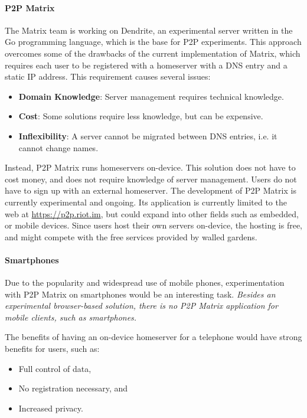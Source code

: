 \paragraph{\ac{P2P} Matrix}
The Matrix team is working on Dendrite\cite{matrix_org_dendrite}, an experimental server written in the Go programming language, which is the base for \ac{P2P} experiments.
This approach overcomes some of the drawbacks of the current implementation of Matrix, which requires each user to be registered with a homeserver with a \ac{DNS} entry and a static IP address.
This requirement causes several issues:
\begin{itemize}
    \item{
          \textbf{Domain Knowledge}:
          Server management requires technical knowledge.
          }
    \item{
          \textbf{Cost}:
          Some solutions require less knowledge, but can be expensive.
          }
    \item{
          \textbf{Inflexibility}:
          A server cannot be migrated between \ac{DNS} entries, i.e. it cannot change names.
          }
\end{itemize}
Instead, \ac{P2P} Matrix runs homeservers on-device.
This solution does not have to cost money, and does not require knowledge of server management.
Users do not have to sign up with an external homeserver.
The development of \ac{P2P} Matrix is currently experimental and ongoing.
Its application is currently limited to the web at \url{https://p2p.riot.im}, but could expand into other fields such as embedded, or mobile devices.
Since users host their own servers on-device, the hosting is free, and might compete with the free services provided by walled gardens.

\paragraph{Smartphones}
Due to the popularity and widespread use of mobile phones, experimentation with \ac{P2P} Matrix on smartphones would be an interesting task.
\textit{Besides an experimental browser-based solution\cite{fosdem_event_p2p_matrix}, there is no \ac{P2P} Matrix application for mobile clients, such as smartphones.}

The benefits of having an on-device homeserver for a telephone would have strong benefits for users, such as:
\begin{itemize}
    \item Full control of data,
    \item No registration necessary, and
    \item Increased privacy.
\end{itemize}

